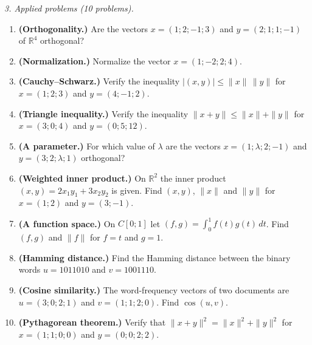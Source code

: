 \emph{3. Applied problems (10 problems).}
\bigskip
\begin{enumerate}[label=\arabic*., leftmargin=*]
\item \textbf{(Orthogonality.)} Are the vectors $x=(1;2;-1;3)$ and $y=(2;1;1;-1)$ of $\mathbb R^4$ orthogonal?
\item \textbf{(Normalization.)} Normalize the vector $x=(1;-2;2;4)$.
\item \textbf{(Cauchy–Schwarz.)} Verify the inequality $|(x,y)|\le\|x\|\,\|y\|$ for $x=(1;2;3)$ and $y=(4;-1;2)$.
\item \textbf{(Triangle inequality.)} Verify the inequality $\|x+y\|\le\|x\|+\|y\|$ for $x=(3;0;4)$ and $y=(0;5;12)$.
\item \textbf{(A parameter.)} For which value of $\lambda$ are the vectors $x=(1;\lambda;2;-1)$ and $y=(3;2;\lambda;1)$ orthogonal?
\item \textbf{(Weighted inner product.)} On $\mathbb R^2$ the inner product $(x,y)=2x_1y_1+3x_2y_2$ is given. Find $(x,y)$, $\|x\|$ and $\|y\|$ for $x=(1;2)$ and $y=(3;-1)$.
\item \textbf{(A function space.)} On $C[0;1]$ let $(f,g)=\int_0^1 f(t)g(t)\,dt$. Find $(f,g)$ and $\|f\|$ for $f=t$ and $g=1$.
\item \textbf{(Hamming distance.)} Find the Hamming distance between the binary words $u=1011010$ and $v=1001110$.
\item \textbf{(Cosine similarity.)} The word-frequency vectors of two documents are $u=(3;0;2;1)$ and $v=(1;1;2;0)$. Find $\cos(u,v)$.
\item \textbf{(Pythagorean theorem.)} Verify that $\|x+y\|^2=\|x\|^2+\|y\|^2$ for $x=(1;1;0;0)$ and $y=(0;0;2;2)$.
\end{enumerate}

